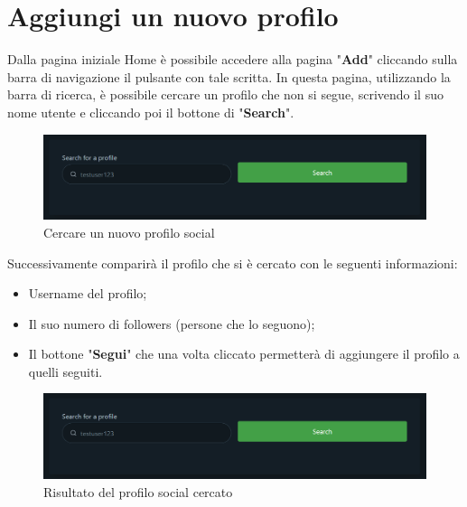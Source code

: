\section{Aggiungi un nuovo profilo} {
    Dalla pagina iniziale Home è possibile accedere alla pagina "\textbf{Add}" cliccando sulla barra di navigazione il pulsante con tale scritta.
    \aCapo
    In questa pagina, utilizzando la barra di ricerca, è possibile cercare un profilo che non si segue, scrivendo il suo nome utente e cliccando poi il bottone di "\textbf{Search}". 
    
    \begin{figure}[H]
        \includegraphics[width=12cm]{sezioni/images/add.png}
        \centering
        \caption{Cercare un nuovo profilo social}
    \end{figure}
    
    Successivamente comparirà il profilo che si è cercato con le seguenti informazioni:
    \begin{itemize}
        \item Username del profilo;
        \item Il suo numero di followers (persone che lo seguono);
        \item Il bottone "\textbf{Segui}" che una volta cliccato permetterà di aggiungere il profilo a quelli seguiti.
    \end{itemize}

    \begin{figure}[H]
        \includegraphics[width=12cm]{sezioni/images/add.png}
        \centering
        \caption{Risultato del profilo social cercato}
    \end{figure}

}

